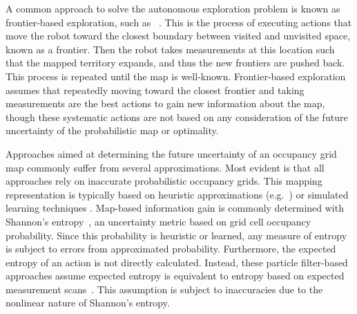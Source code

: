 \documentclass[letterpaper, 10pt, conference]{ieeeconf}
\begin{document}
A common approach to solve the autonomous exploration problem is known as frontier-based exploration, such as ~\cite{Yam97,Yam98}. This is the process of executing actions that move the robot toward the closest boundary between visited and unvisited space, known as a frontier.
Then the robot takes measurements at this location such that the mapped territory expands, and thus the new frontiers are pushed back. This process is repeated until the map is well-known.
Frontier-based exploration assumes that repeatedly moving toward the closest frontier and taking measurements are the best actions to gain new information about the map, though these systematic actions are not based on any consideration of the future uncertainty of the probabilistic map or optimality.


Approaches aimed at determining the future uncertainty of an occupancy grid map commonly suffer from several approximations.
Most evident is that all approaches rely on inaccurate probabilistic occupancy grids. This mapping representation is typically based on heuristic approximations (e.g.~\cite{MorElf85,Elf89,ChoLynHutKanBurKavThr05,And09,PirRutBisSch11}) or simulated learning techniques \cite{ThrBurFox05,Thr01}. Map-based information gain is commonly determined with Shannon's entropy~\cite{StaGriBur05}, an uncertainty metric based on grid cell occupancy probability. Since this probability is heuristic or learned, any measure of entropy is subject to errors from approximated probability.
Furthermore, the expected entropy of an action is not directly calculated. Instead, these particle filter-based approaches assume expected entropy is equivalent to entropy based on expected measurement scans~\cite{JohStaPfaBur07}. This assumption is subject to inaccuracies due to the nonlinear nature of Shannon's entropy. %
\end{document}
